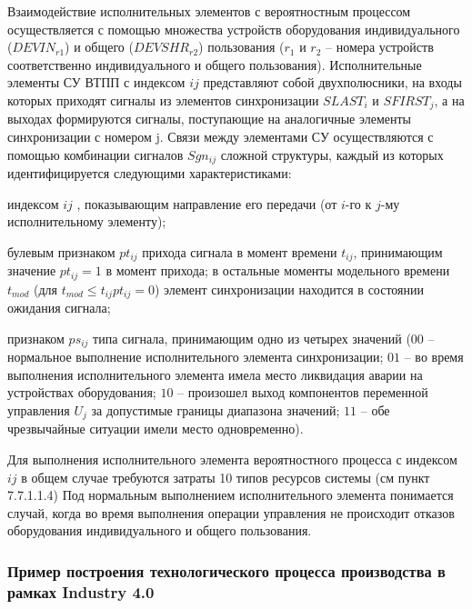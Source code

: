 Взаимодействие исполнительных элементов с вероятностным процессом осуществляется с помощью множества устройств оборудования индивидуального  ($DEVIN_{r1}$) и общего ($DEVSHR_{r2}$) пользования ($r_1$ и $r_2$ – номера устройств соответственно индивидуального и общего пользования). Исполнительные элементы СУ ВТПП с индексом $ij$ представляют собой двухполюсники, на входы которых приходят сигналы из элементов синхронизации $SLAST_i$ и $SFIRST_j$, а на выходах формируются сигналы, поступающие на аналогичные элементы синхронизации с номером j. Связи между элементами СУ осуществляются с помощью комбинации сигналов {$Sgn_{ij}$} сложной структуры, каждый из которых идентифицируется следующими характеристиками:
\begin{textitemize}
    \item индексом $ij$ , показывающим направление его передачи (от $i$-го к $j$-му исполнительному элементу);
    \item булевым признаком $pt_{ij}$ прихода сигнала в момент времени $t_{ij}$, принимающим значение  $pt_{ij}=1$ в момент прихода; в остальные моменты модельного времени $t_{mod}$ (для $t_{mod} \leq t_{ij} pt_{ij}=0$) элемент синхронизации находится в состоянии ожидания сигнала;
    \item признаком $ps_{ij}$ типа сигнала, принимающим одно из четырех значений ($00$ – нормальное выполнение исполнительного элемента синхронизации; $01$ – во время выполнения исполнительного элемента имела место ликвидация аварии на устройствах оборудования; $10$ – произошел выход компонентов переменной управления $U_j$ за допустимые границы диапазона значений; $11$ – обе чрезвычайные ситуации имели место одновременно).
\end{textitemize}


Для выполнения исполнительного элемента вероятностного процесса с индексом $ij$ в общем случае требуются затраты 10 типов ресурсов системы (см пункт 7.7.1.1.4)
Под нормальным выполнением исполнительного элемента понимается случай, когда во время выполнения операции управления не происходит отказов оборудования индивидуального и общего пользования.


\subsubsection{Пример построения технологического процесса производства в рамках Industry 4.0}

